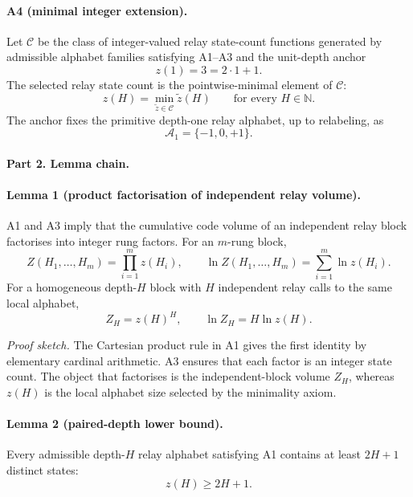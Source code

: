\paragraph{A4 (minimal integer extension).}
Let \(\mathcal C\) be the class of integer-valued relay state-count functions generated by admissible alphabet families satisfying A1--A3 and the unit-depth anchor
\begin{equation}
z(1)=3=2\cdot 1+1.
\end{equation}
The selected relay state count is the pointwise-minimal element of \(\mathcal C\):
\begin{equation}
z(H)=\min_{\widetilde z\in\mathcal C}\widetilde z(H)
\qquad
\text{for every }H\in\mathbb N.
\end{equation}
The anchor fixes the primitive depth-one relay alphabet, up to relabeling, as
\begin{equation}
\mathcal A_1=\{-1,0,+1\}.
\end{equation}

\paragraph{Part 2. Lemma chain.}

\paragraph{Lemma 1 (product factorisation of independent relay volume).}
A1 and A3 imply that the cumulative code volume of an independent relay block factorises into integer rung factors. For an \(m\)-rung block,
\begin{equation}
Z(H_1,\ldots,H_m)
=
\prod_{i=1}^m z(H_i),
\qquad
\ln Z(H_1,\ldots,H_m)
=
\sum_{i=1}^m \ln z(H_i).
\end{equation}
For a homogeneous depth-\(H\) block with \(H\) independent relay calls to the same local alphabet,
\begin{equation}
Z_H=z(H)^H,
\qquad
\ln Z_H=H\ln z(H).
\end{equation}

\emph{Proof sketch.}
The Cartesian product rule in A1 gives the first identity by elementary cardinal arithmetic. A3 ensures that each factor is an integer state count. The object that factorises is the independent-block volume \(Z_H\), whereas \(z(H)\) is the local alphabet size selected by the minimality axiom.

\paragraph{Lemma 2 (paired-depth lower bound).}
Every admissible depth-\(H\) relay alphabet satisfying A1 contains at least \(2H+1\) distinct states:
\begin{equation}
z(H)\geq 2H+1.
\end{equation}

